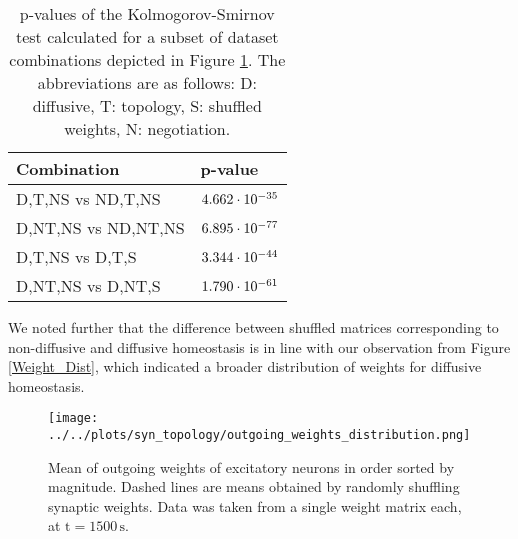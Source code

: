 \documentclass[10pt,a4paper]{article}
\begin{document}
\begin{table}
\begin{tabu}{|l|l|}
\hline
\textbf{Combination} & \textbf{p-value} \\ \hline
D,T,NS vs ND,T,NS & $\rm 4.662 \cdot 10^{-35}$ \\ \hline
D,NT,NS vs ND,NT,NS & $\rm 6.895 \cdot 10^{-77}$ \\ \hline
D,T,NS vs D,T,S & $\rm 3.344 \cdot 10^{-44}$ \\ \hline
D,NT,NS vs D,NT,S & $\rm 1.790 \cdot 10^{-61}$ \\ \hline
\end{tabu}
\caption{p-values of the Kolmogorov-Smirnov test calculated for a subset of dataset combinations depicted in Figure \ref{Out_Weight_Mean_Quantile}. The abbreviations are as follows: D: diffusive, T: topology, S: shuffled weights, N: negotiation.}
\label{Kolmogorov_Mean_Out}
\end{table}

We noted further that the difference between shuffled matrices corresponding to non-diffusive and diffusive homeostasis is in line with our observation from Figure \ref{Weight_Dist}, which indicated a broader distribution of weights for diffusive homeostasis.
\begin{figure}
\texttt{[image: ../../plots/syn\_topology/outgoing\_weights\_distribution.png]}
\caption{Mean of outgoing weights of excitatory neurons in order sorted by magnitude. Dashed lines are means obtained by randomly shuffling synaptic weights. Data was taken from a single weight matrix each, at $\mathrm{t = 1500\,s}$.}
\label{Out_Weight_Mean_Quantile}
\end{figure}
\end{document}
